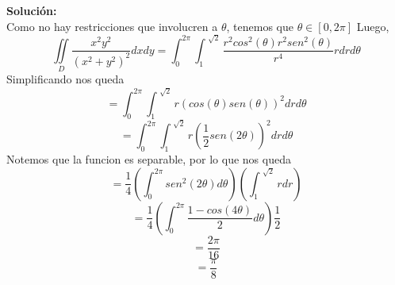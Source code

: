 \documentclass[12pt]{article}
\newenvironment{solucion}
{\begin{mdframed}[backgroundcolor=black!10]
		{\bf Solución:}\\
	}
	{
	\end{mdframed}
}
\newenvironment{preguntas}
{\begin{enumerate}\itemsep12pt
	}
	{
	\end{enumerate}
}
\begin{document}
\begin{preguntas}
\begin{solucion}
		Como no hay restricciones que involucren a $\theta$, tenemos que $\theta \in [0, 2\pi]$
		Luego, 
		$$\displaystyle\iint\limits_D \dfrac{x^2y^2}{(x^2+y^2)^2}dxdy =
		 \displaystyle\int_0^{2\pi} \displaystyle\int_1^{\sqrt[]{2}} \dfrac{r^2 cos^2(\theta) r^2 sen^2(\theta)}{r^4}rdrd\theta$$
		Simplificando nos queda
		$$ =\displaystyle\int_0^{2\pi} \displaystyle\int_1^{\sqrt[]{2}} r (cos(\theta) sen(\theta))^2drd\theta$$
		$$ =\displaystyle\int_0^{2\pi} \displaystyle\int_1^{\sqrt[]{2}} r \left(\dfrac{1}{2} sen(2\theta) \right)^2drd\theta$$
		Notemos que la funcion es separable, por lo que nos queda
		$$ =\dfrac{1}{4} \left(\displaystyle\int_0^{2\pi} sen^2(2\theta)d\theta \right) \left(\displaystyle\int_1^{\sqrt[]{2}} rdr \right)$$
		$$ =\dfrac{1}{4} \left(\displaystyle\int_0^{2\pi} \dfrac{1-cos(4\theta)}{2} d\theta \right) \dfrac{1}{2}$$
		$$ = \dfrac{2\pi}{16}$$
		$$ = \dfrac{\pi}{8}$$
\end{solucion}
\end{preguntas}
\end{document}
